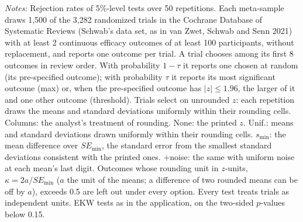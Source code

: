 \begin{table}[htbp]
\begin{minipage}{\linewidth}\footnotesize\textit{Notes:} Rejection rates of 5\%-level tests over 50 repetitions. Each meta-sample draws 1{,}500 of the 3{,}282 randomized trials in the Cochrane Database of Systematic Reviews (Schwab's data set, as in van Zwet, Schwab and Senn 2021) with at least 2 continuous efficacy outcomes of at least 100 participants, without replacement, and reports one outcome per trial. A trial chooses among its first 8 outcomes in review order. With probability $1 - \tau$ it reports one chosen at random (its pre-specified outcome); with probability $\tau$ it reports its most significant outcome (max) or, when the pre-specified outcome has $|z| \le 1.96$, the larger of it and one other outcome (threshold). Trials select on unrounded $z$: each repetition draws the means and standard deviations uniformly within their rounding cells. Columns: the analyst's treatment of rounding. None: the printed $z$. Unif.: means and standard deviations drawn uniformly within their rounding cells. $s_{\min}$: the mean difference over $SE_{\min}$, the standard error from the smallest standard deviations consistent with the printed ones. $+$noise: the same with uniform noise at each mean's last digit. Outcomes whose rounding unit in $z$-units, $\kappa = 2a/SE_{\min}$ ($a$ the unit of the means; a difference of two rounded means can be off by $a$), exceeds 0.5 are left out under every option. Every test treats trials as independent units. EKW tests as in the application, on the two-sided $p$-values below 0.15.\end{minipage}
\end{table}
